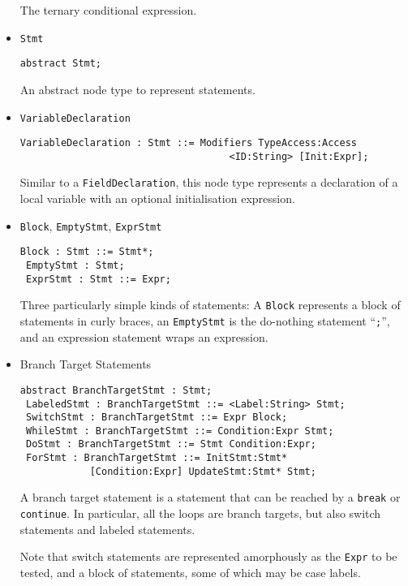 \documentclass{article}
\newcommand{\nt}[1]{\texttt{#1}}
\newcommand{\code}[1]{\lstinline$#1$}
\begin{document}
\begin{itemize}
  The ternary conditional expression.

\item \nt{Stmt}
  \begin{lstlisting}[frame=single]
 abstract Stmt;
  \end{lstlisting}

  An abstract node type to represent statements.

\item \nt{VariableDeclaration}
  \begin{lstlisting}[frame=single]
 VariableDeclaration : Stmt ::= Modifiers TypeAccess:Access 
                                    <ID:String> [Init:Expr];
  \end{lstlisting}

  Similar to a \nt{FieldDeclaration}, this node type represents a declaration
  of a local variable with an optional initialisation expression.

\item \nt{Block}, \nt{EmptyStmt}, \nt{ExprStmt}
  \begin{lstlisting}[frame=single]
 Block : Stmt ::= Stmt*;
 EmptyStmt : Stmt;
 ExprStmt : Stmt ::= Expr;
  \end{lstlisting}

  Three particularly simple kinds of statements: A \nt{Block} represents
  a block of statements in curly braces, an \nt{EmptyStmt} is the do-nothing
  statement ``\code{;}'', and an expression statement wraps an expression.

\item Branch Target Statements
  \begin{lstlisting}[frame=single]
 abstract BranchTargetStmt : Stmt;
 LabeledStmt : BranchTargetStmt ::= <Label:String> Stmt;
 SwitchStmt : BranchTargetStmt ::= Expr Block;
 WhileStmt : BranchTargetStmt ::= Condition:Expr Stmt;
 DoStmt : BranchTargetStmt ::= Stmt Condition:Expr;
 ForStmt : BranchTargetStmt ::= InitStmt:Stmt* 
            [Condition:Expr] UpdateStmt:Stmt* Stmt;
  \end{lstlisting}

  A branch target statement is a statement that can be reached by a
  \code{break} or \code{continue}. In particular, all the loops are
  branch targets, but also switch statements and labeled statements.

  Note that switch statements are represented amorphously as the \nt{Expr}
  to be tested, and a block of statements, some of which may be case labels.


\end{itemize}
\end{document}
